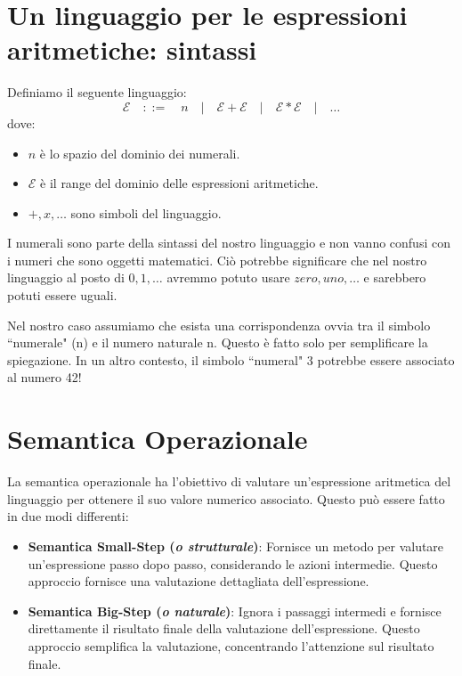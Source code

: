 \section{Un linguaggio per le espressioni aritmetiche: sintassi}
Definiamo il seguente linguaggio:
\[
    \mathcal{E}\quad ::= \quad n \quad | \quad \mathcal{E} + \mathcal{E} \quad | 
    \quad \mathcal{E} * \mathcal{E} \quad | \quad \dots
\]
dove:
\begin{itemize}
    \item $n$ è lo spazio del dominio dei numerali.
    \item $\mathcal{E}$ è il range del dominio delle espressioni aritmetiche.
    \item $+, x, \dots$ sono simboli del linguaggio.
\end{itemize}
I numerali sono parte della sintassi del nostro linguaggio e non vanno confusi con i numeri
che sono oggetti matematici.
Ciò potrebbe significare che nel nostro linguaggio al posto di $0, 1, \dots$ avremmo 
potuto usare $zero, uno, \dots$ e sarebbero potuti essere uguali.

Nel nostro caso assumiamo che esista una corrispondenza ovvia tra il simbolo ``numerale" (n)
e il numero naturale n. Questo è fatto solo per semplificare la spiegazione. In un
altro contesto, il simbolo ``numeral" 3 potrebbe essere associato al numero 42!

\section{Semantica Operazionale}

La semantica operazionale ha l'obiettivo di valutare un'espressione aritmetica
del linguaggio per ottenere il suo valore numerico associato. Questo può essere
fatto in due modi differenti:

\begin{itemize}
  \item \textbf{Semantica Small-Step (\textit{o strutturale})}: Fornisce un metodo per
  valutare un'espressione passo dopo passo, considerando le azioni intermedie.
  Questo approccio fornisce una valutazione dettagliata dell'espressione.

  \item \textbf{Semantica Big-Step (\textit{o naturale})}: Ignora i passaggi intermedi
  e fornisce direttamente il risultato finale della valutazione dell'espressione. Questo
  approccio semplifica la valutazione, concentrando l'attenzione sul risultato finale.

\end{itemize}

